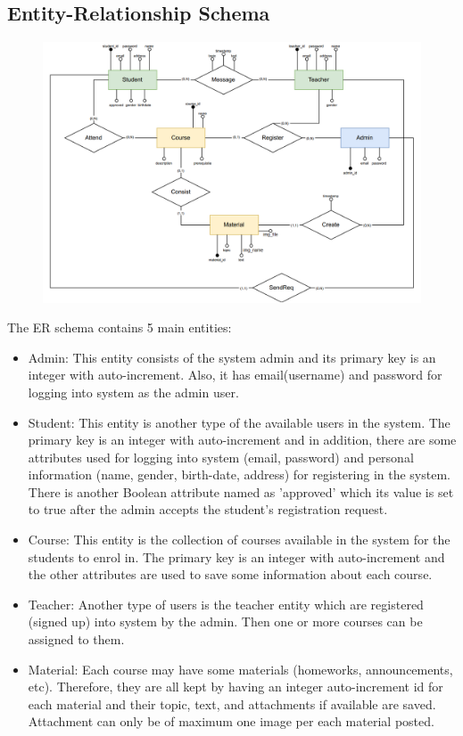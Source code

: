 \subsection{Entity-Relationship Schema}

 \begin{figure}[h!]
   \centering
   \includegraphics[width=17.7cm]{images/FINAL-ER.png}
 \end{figure}
 
The ER schema contains 5 main entities:
 \begin{itemize}
  \item Admin: This entity consists of the system admin and its primary key is an integer with auto-increment. Also, it has email(username) and password for logging into system as the admin user.
  \item Student: This entity is another type of the available users in the system. The primary key is an integer with auto-increment and in addition, there are some attributes used for logging into system (email, password) and personal information (name, gender, birth-date, address) for registering in the system. There is another Boolean attribute named as 'approved' which its value is set to true after the admin accepts the student's registration request.
  \item Course: This entity is the collection of courses available in the system for the students to enrol in. The primary key is an integer with auto-increment and the other attributes are used to save some information about each course.
  \item Teacher: Another type of users is the teacher entity which are registered (signed up) into system by the admin. Then one or more courses can be assigned to them.
  \item Material: Each course may have some materials (homeworks, announcements, etc). Therefore, they are all kept by having an integer auto-increment id for each material and their topic, text, and attachments if available are saved. Attachment can only be of maximum one image per each material posted.
 \end{itemize}